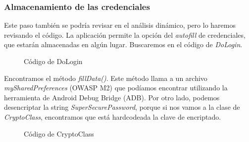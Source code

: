 \documentclass[12pt,twoside]{article}
\begin{document}
\subsubsection{Almacenamiento de las credenciales}
Este paso también se podría revisar en el análisis dinámico, pero lo haremos revisando el código. La aplicación permite la opción del \textit{autofill} de credenciales, que estarán almacenadas en algún lugar.
Buscaremos en el código de \textit{DoLogin}.
\begin{figure}[H]
    \centering
    \caption{Código de DoLogin}
\end{figure}
Encontramos el método \textit{fillData()}. Este método llama a un archivo \textit{mySharedPreferences} (OWASP M2) que podíamos encontrar utilizando la herramienta de Android Debug Bridge (ADB). Por otro lado, podemos desencriptar la string \textit{SuperSecurePassword}, porque si nos vamos a la clase de \textit{CryptoClass}, encontramos que está hardcodeada la clave de encriptado. 
\begin{figure}[H]
    \centering
    \caption{Código de CryptoClass}
\end{figure}
\end{document}
